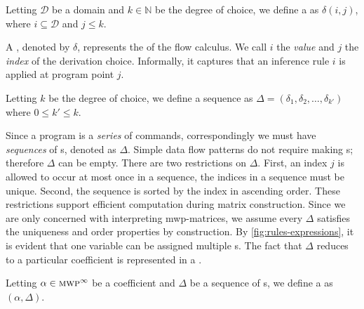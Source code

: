\begin{definition}
Letting \( \mathcal{D} \) be a domain and \( k \in \mathbb{N}
\) be the degree of choice, we define a  as \( \delta(i, j) \), where \( i \subseteq \mathcal{D} \)
and \( j \leq k \).
\end{definition}
A , denoted by \(\delta\), represents the
 of the flow calculus. We call
\(i\) the \emph{value} and \(j\) the \emph{index} of the
derivation choice. Informally, it captures that an inference rule \(i\) is
applied at program point \(j\).

\begin{definition}
Letting \(k\) be the degree of choice, we define a  sequence as \(\Delta = (\delta_1, \delta_2, \dots,
\delta_{k'})\) where \(0 \leq k' \leq k \).
\end{definition}

Since a program is a \emph{series} of commands, correspondingly we must have
\emph{sequences} of s, denoted as
\(\Delta\). Simple data flow patterns do not require making
s; therefore \(\Delta\) can be empty. There
are two restrictions on \(\Delta\). First, an index \(j\)
is allowed to occur at most once in a sequence, \ie the indices in a sequence
must be unique. Second, the sequence is sorted by the index in ascending order.
These restrictions support efficient computation during matrix
construction. Since we are only concerned with {interpreting}
mwp-matrices, we assume every \(\Delta\)
satisfies the uniqueness and order properties by construction. By
\autoref{fig:rules-expressions}, it is evident that one variable can be assigned
multiple s. The fact that \(\Delta\) reduces
to a particular coefficient is represented in a \emph{}.

\begin{definition}[Monomial]\label{def:mono}
Letting \(\alpha \in \text{\textsc{mwp}}^\infty\) be a
coefficient and \(\Delta\) be a sequence of s, we define a  as \((\alpha,
\Delta)\).
\end{definition}

